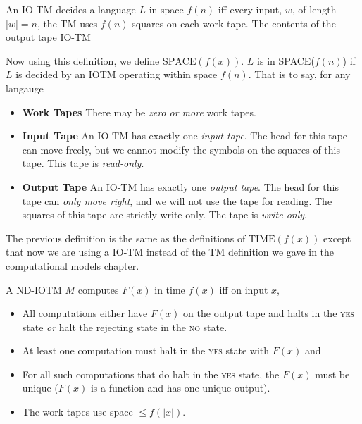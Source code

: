 


An IO-TM decides a language $L$ in space $f(n)$ 
iff every input, $w$, of length $|w| = n$, 
the TM uses $f(n)$ squares on each work tape.
The contents of the output tape IO-TM 

Now using this definition, we define $\text{SPACE}(f(x))$.
$L$ is in SPACE($f(n)$) if $L$ is decided by an IOTM operating
within space $f(n)$. That is to say, for any langauge 
\begin{itemize}   
\renewcommand{\labelitemi}{$\Box$}
\item \textbf{Work Tapes} 
There may be \textit{zero or more} work tapes.
\item \textbf{Input Tape} 
An IO-TM has exactly one \textit{input tape}. 
The head for this tape can move freely, but we 
cannot modify the symbols on the squares of this tape. 
This tape is \textit{read-only}. 
\item \textbf{Output Tape} 
An IO-TM has exactly one \textit{output tape}. 
The head for this tape can \textit{only move right}, and we 
will not use the tape for reading.
The squares of this tape are strictly write only.  
The tape is \textit{write-only}. 
\end{itemize} 

The previous definition is the same as 
the definitions of $\text{TIME}(f(x))$ except that now we are 
using a IO-TM instead of the TM definition we gave in the 
computational models chapter. 

\frmrule

A ND-IOTM $M$ computes $F(x)$ in time $f(x)$ iff on input $x$,
\begin{itemize}   
\renewcommand{\labelitemi}{$\Box$}
\item All computations either have $F(x)$ on the output tape
and halts in the \textsc{yes} state \textit{or}
halt the rejecting state in the \textsc{no} state.
\item At least one computation must halt 
in the \textsc{yes} state with $F(x)$ and 
\item For all such computations that do halt 
in the \textsc{yes} state, the $F(x)$ must be unique 
($F(x)$ is a function and has one unique output).
\item The work tapes use space $\leqslant f(|x|)$.  
\end{itemize} 


\frmrule

